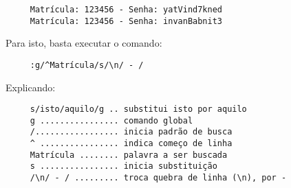 \begin{verbatim}
     Matrícula: 123456 - Senha: yatVind7kned
     Matrícula: 123456 - Senha: invanBabnit3
\end{verbatim}

Para isto, basta executar o comando:

\begin{verbatim}
     :g/^Matrícula/s/\n/ - /
\end{verbatim}

Explicando:

\begin{verbatim}
     s/isto/aquilo/g .. substitui isto por aquilo
     g ................ comando global
     /................. inicia padrão de busca
     ^ ................ indica começo de linha
     Matrícula ........ palavra a ser buscada
     s ................ inicia substituição
     /\n/ - / ......... troca quebra de linha (\n), por -
\end{verbatim}
